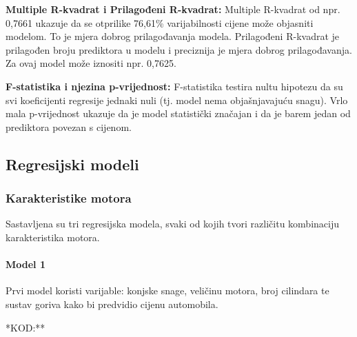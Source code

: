 \documentclass[
]{article}
\begin{document}
\textbf{Multiple R-kvadrat i Prilagođeni R-kvadrat:} Multiple R-kvadrat
od npr. 0,7661 ukazuje da se otprilike 76,61\% varijabilnosti cijene
može objasniti modelom. To je mjera dobrog prilagođavanja modela.
Prilagođeni R-kvadrat je prilagođen broju prediktora u modelu i
preciznija je mjera dobrog prilagođavanja. Za ovaj model može iznositi
npr. 0,7625.

\textbf{F-statistika i njezina p-vrijednost:} F-statistika testira nultu
hipotezu da su svi koeficijenti regresije jednaki nuli (tj. model nema
objašnjavajuću snagu). Vrlo mala p-vrijednost ukazuje da je model
statistički značajan i da je barem jedan od prediktora povezan s
cijenom.

\subsection{Regresijski modeli}\label{regresijski-modeli}

\subsubsection{Karakteristike motora}\label{karakteristike-motora}

Sastavljena su tri regresijska modela, svaki od kojih tvori različitu
kombinaciju karakteristika motora.

\paragraph{Model 1}\label{model-1}

Prvi model koristi varijable: konjske snage, veličinu motora, broj
cilindara te sustav goriva kako bi predvidio cijenu automobila.

*KOD:**
\end{document}

